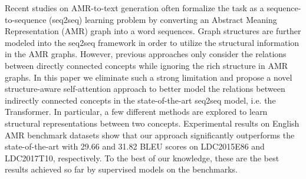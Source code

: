 Recent studies on AMR-to-text generation often formalize the task as a sequence-to-sequence (seq2seq) learning problem by converting an Abstract Meaning Representation (AMR) graph into a word sequences. Graph structures are further modeled into the seq2seq framework in order to utilize the structural information in the AMR graphs. However, previous approaches only consider the relations between directly connected concepts while ignoring the rich structure in AMR graphs. In this paper we eliminate such a strong limitation and propose a novel structure-aware self-attention approach to better model the relations between indirectly connected concepts in the  state-of-the-art seq2seq model, i.e. the Transformer. In particular, a few different methods are explored to learn structural representations between two concepts. Experimental results on English AMR benchmark datasets show that our approach significantly outperforms the state-of-the-art with 29.66 and 31.82 BLEU scores on LDC2015E86 and LDC2017T10, respectively. To the best of our knowledge, these are the best results achieved so far by supervised models on the benchmarks.